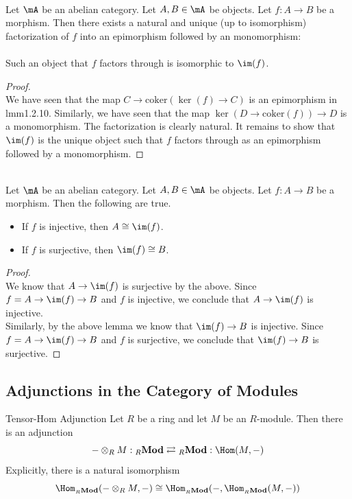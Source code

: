 \documentclass[a4paper]{article}
\begin{document}
\begin{lmm}{}{}\\
Let $\mA$ be an abelian category. Let $A,B\in\mA$ be objects. Let $f:A\to B$ be a morphism. Then there exists a natural and unique (up to isomorphism) factorization of $f$ into an epimorphism followed by an monomorphism: \\
 \\
Such an object that $f$ factors through is isomorphic to $\im(f)$. 
\begin{proof}\\
We have seen that the map $C\to\text{coker}(\ker(f)\to C)$ is an epimorphism in lmm1.2.10. Similarly, we have seen that the map $\ker(D\to\text{coker}(f))\to D$ is a monomorphism. The factorization is clearly natural. It remains to show that $\im(f)$ is the unique object such that $f$ factors through as an epimorphism followed by a monomorphism. 
\end{proof}
\end{lmm}

\begin{lmm}{}{}\\
Let $\mA$ be an abelian category. Let $A,B\in\mA$ be objects. Let $f:A\to B$ be a morphism. Then the following are true. 
\begin{itemize}
\item If $f$ is injective, then $A\cong\im(f)$. 
\item If $f$ is surjective, then $\im(f)\cong B$. 
\end{itemize}
\begin{proof}\\
We know that $A\to\im(f)$ is surjective by the above. Since $f=A\to\im(f)\to B$ and $f$ is injective, we conclude that $A\to\im(f)$ is injective. \\

Similarly, by the above lemma we know that $\im(f)\to B$ is injective. Since $f=A\to\im(f)\to B$ and $f$ is surjective, we conclude that $\im(f)\to B$ is surjective. 
\end{proof}
\end{lmm}

\subsection{Adjunctions in the Category of Modules}
\begin{thm}{Tensor-Hom Adjunction}{} Let $R$ be a ring and let $M$ be an $R$-module. Then there is an adjunction $$-\otimes_RM:{_R\bold{Mod}}\rightleftarrows{_R\bold{Mod}}:\Hom(M,-)$$ Explicitly, there is a natural isomorphism $$\Hom_{_R\bold{Mod}}(-\otimes_RM,-)\cong\Hom_{_R\bold{Mod}}(-,\Hom_{_R\bold{Mod}}(M,-))$$ 
\end{thm}
\end{document}
